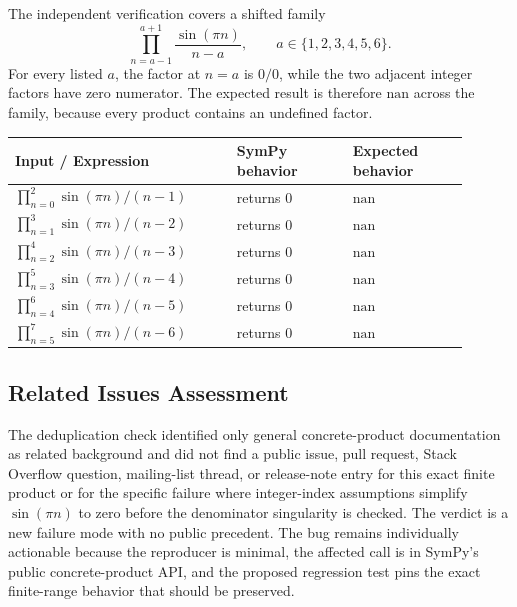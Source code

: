 \documentclass[11pt]{article}
\begin{document}
The independent verification covers a shifted family
\[
  \prod_{n=a-1}^{a+1}\frac{\sin(\pi n)}{n-a},
  \qquad a\in\{1,2,3,4,5,6\}.
\]
For every listed \(a\), the factor at \(n=a\) is \(0/0\), while the two adjacent
integer factors have zero numerator. The expected result is therefore
\(\mathrm{nan}\) across the family, because every product contains an undefined
factor.

\begin{center}
\renewcommand{\arraystretch}{1.3}
\begin{tabular}{@{}>{\raggedright\arraybackslash}p{0.44\linewidth}>{\raggedright\arraybackslash}p{0.23\linewidth}>{\raggedright\arraybackslash}p{0.23\linewidth}@{}}
\toprule
\textbf{Input / Expression} & \textbf{SymPy behavior} & \textbf{Expected behavior} \\
\midrule
\(\prod_{n=0}^{2}\sin(\pi n)/(n-1)\) & returns \(0\) & \(\mathrm{nan}\) \\
\(\prod_{n=1}^{3}\sin(\pi n)/(n-2)\) & returns \(0\) & \(\mathrm{nan}\) \\
\(\prod_{n=2}^{4}\sin(\pi n)/(n-3)\) & returns \(0\) & \(\mathrm{nan}\) \\
\(\prod_{n=3}^{5}\sin(\pi n)/(n-4)\) & returns \(0\) & \(\mathrm{nan}\) \\
\(\prod_{n=4}^{6}\sin(\pi n)/(n-5)\) & returns \(0\) & \(\mathrm{nan}\) \\
\(\prod_{n=5}^{7}\sin(\pi n)/(n-6)\) & returns \(0\) & \(\mathrm{nan}\) \\
\bottomrule
\end{tabular}
\end{center}

\subsection{Related Issues Assessment}

The deduplication check identified only general concrete-product documentation
as related background and did not find a public issue, pull request, Stack
Overflow question, mailing-list thread, or release-note entry for this exact
finite product or for the specific failure where integer-index assumptions
simplify \(\sin(\pi n)\) to zero before the denominator singularity is checked.
The verdict is a new failure mode with no public precedent. The bug remains
individually actionable because the reproducer is minimal, the affected call is
in SymPy's public concrete-product API, and the proposed regression test pins
the exact finite-range behavior that should be preserved.
\end{document}
